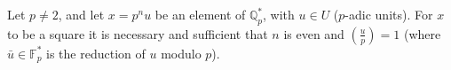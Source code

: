 Let $p \neq 2$, and let $x = p^n u$ be an element of $\mathbb{Q}_p^*$, with $u \in U$ ($p$-adic units). For $x$ to be a square it is necessary and sufficient that $n$ is even and $\left(\frac{u}{p}\right) = 1$ (where $\bar{u} \in \mathbb{F}_p^*$ is the reduction of $u$ modulo $p$).
